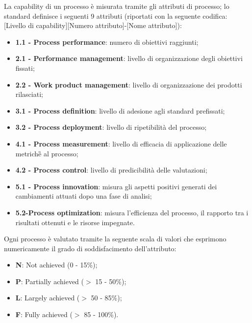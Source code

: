 La capability di un processo è misurata tramite gli attributi di processo; lo standard definisce i seguenti 9 attributi
(riportati con la seguente codifica: [Livello di capability][Numero attributo]-[Nome attributo]):
\begin{itemize}
	\item \textbf{1.1 - Process performance}: numero di obiettivi raggiunti;
	\item \textbf{2.1 - Performance management}: livello di organizzazione degli obiettivi fissati;
	\item \textbf{2.2 - Work product management}: livello di organizzazione dei prodotti rilasciati;
	\item \textbf{3.1 - Process definition}: livello di adesione agli standard prefissati;
	\item \textbf{3.2 - Process deployment}: livello di ripetibilità del processo;
	\item \textbf{4.1 - Process measurement}: livello di efficacia di applicazione delle metriche\G{} al processo;
	\item \textbf{4.2 - Process control}: livello di predicibilità delle valutazioni;
	\item \textbf{5.1 - Process innovation}: misura gli aspetti positivi generati dei cambiamenti attuati dopo una
	fase di analisi;
	\item \textbf{5.2-Process optimization}: misura l'efficienza del processo, il rapporto tra i risultati ottenuti e
	le risorse impegnate.
\end{itemize}

Ogni processo è valutato tramite la seguente scala di valori che esprimono numericamente il grado di
soddisfacimento dell'attributo:
\begin{itemize}
	\item \textbf{N}: Not achieved (0 - 15\%);
	\item \textbf{P}: Partially achieved ($>$ 15 - 50\%);
	\item \textbf{L}: Largely achieved ($>$ 50 - 85\%);
	\item \textbf{F}: Fully achieved ($>$ 85 - 100\%).
\end{itemize}
